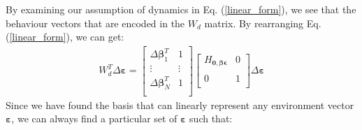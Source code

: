 \documentclass[journal]{IEEEtran}
\begin{document}
By examining our assumption of dynamics in Eq. (\ref{linear_form}), we see that the behaviour vectors that are encoded in the $W_d$ matrix.
By rearranging Eq. (\ref{linear_form}), we can get:
\begin{equation}
\begin{gathered}
W_{d}^T \Delta \bm{\varepsilon} = 
\begin{bmatrix}
\Delta \bm{\beta}_1^T & 1\\
\vdots & \vdots \\
\Delta \bm{\beta}_N^T & 1\\
\end{bmatrix}
%
\begin{bmatrix}
H_{\bm{0, \beta \epsilon}} & 0 \\
\\
0 & 1 \\
\end{bmatrix}
\Delta \bm{\varepsilon}
\end{gathered}
\label{linear_form_for_beta}
\end{equation}
Since we have found the basis that can linearly represent any environment vector $\bm{\varepsilon}$, we can always find a particular set of $\bm{\varepsilon}$ such that:
\end{document}

